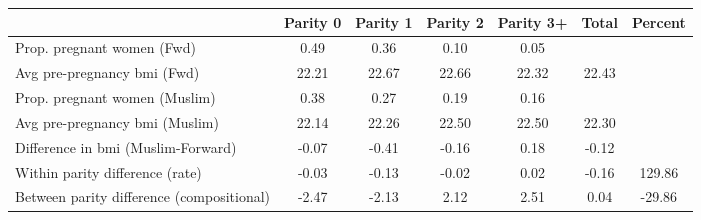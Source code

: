 \begin{tabular}{l*{6}{c}}
\toprule
            &\multicolumn{1}{c}{Parity 0}&\multicolumn{1}{c}{Parity 1}&\multicolumn{1}{c}{Parity 2}&\multicolumn{1}{c}{Parity 3+}&\multicolumn{1}{c}{Total}&\multicolumn{1}{c}{Percent}\\
\midrule
\midrule
Prop. pregnant women (Fwd)&        0.49&        0.36&        0.10&        0.05&            &            \\
Avg pre-pregnancy bmi (Fwd)&       22.21&       22.67&       22.66&       22.32&       22.43&            \\
Prop. pregnant women (Muslim)&        0.38&        0.27&        0.19&        0.16&            &            \\
Avg pre-pregnancy bmi (Muslim)&       22.14&       22.26&       22.50&       22.50&       22.30&            \\
Difference in bmi (Muslim-Forward)&       -0.07&       -0.41&       -0.16&        0.18&       -0.12&            \\
Within parity difference (rate)&       -0.03&       -0.13&       -0.02&        0.02&       -0.16&      129.86\\
Between parity difference (compositional)&       -2.47&       -2.13&        2.12&        2.51&        0.04&      -29.86\\
\bottomrule
\end{tabular}
